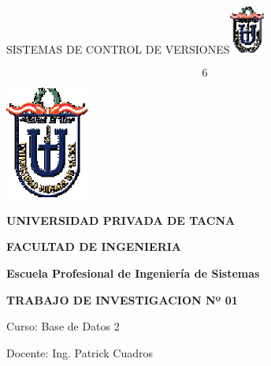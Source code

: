 \documentclass{article} %
\begin{document}


\noindent 

\noindent 

\noindent 

\noindent 

\noindent SISTEMAS DE CONTROL DE VERSIONES\includegraphics*[width=0.47in, height=0.63in, keepaspectratio=false]{image1}

\noindent 
\[6\] 


\noindent \textbf{\includegraphics*[width=1.08in, height=1.46in, keepaspectratio=false]{image2}}

\noindent \textbf{}

\noindent \textbf{UNIVERSIDAD PRIVADA DE TACNA}

\noindent \textbf{}

\noindent \textbf{FACULTAD DE INGENIERIA}

\noindent \textbf{\textit{}}

\noindent \textbf{Escuela Profesional de Ingenier\'{i}a de Sistemas}

\noindent \textbf{}

\noindent \textbf{}

\noindent 

\noindent \textbf{ TRABAJO DE INVESTIGACION Nº 01}

\noindent \textbf{\textit{}}

\noindent \textbf{}

\noindent Curso: Base de Datos 2

\noindent \textbf{\textit{}}

\noindent \textbf{}

\noindent \textbf{}

\noindent Docente: Ing. Patrick Cuadros

\noindent \textbf{\textit{}}
\end{document}
